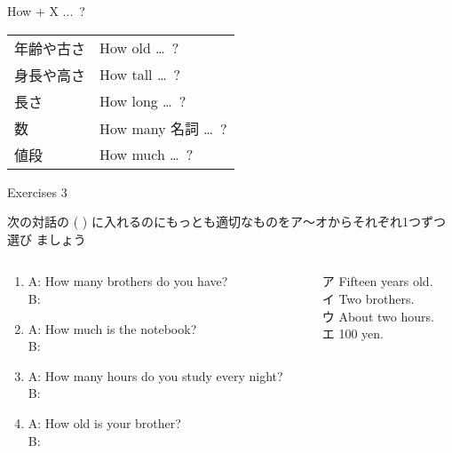 \documentclass[aspectratio=169,xcolor={dvipsnames,table}]{beamer}
\begin{document}
\begin{frame}[plain]{How $+$ X ...\,\,\,?}
 
 \begin{center}
\begin{tabular}{ll}\toprule
年齢や古さ& How old \ldots{}\, ?\\
身長や高さ& How tall \ldots{}\, ?\\
長さ&How long \ldots{}\, ?\\
数&How many 名詞 \ldots{}\, ?\\
値段&How much \ldots{}\, ?\\
\bottomrule
\end{tabular}
\end{center}
\end{frame}
\begin{frame}[plain]{Exercises 3}
 
 次の対話の ( ) に入れるのにもっとも適切なものをア～オからそれぞれ1つずつ選び
ましょう
\begin{columns}
\begin{column}{.65\textwidth}
\begin{enumerate}
 \item A: How many brothers do you have?\\
B: 
\item A: How much is the notebook? \\
B:   
 \item  A: How many hours do you study every night?\\ 
B:   
  \item A: How old is your brother?\\
B:  
\end{enumerate} 
\end{column}
\begin{column}{.35\textwidth}
\begin{tcolorbox}
 
ア Fifteen years old.\\
イ Two brothers.\\
ウ About two hours.\\
エ 100 yen.
\end{tcolorbox}
\hfill{}
\end{column}
\end{columns}
\end{frame}
\end{document}
